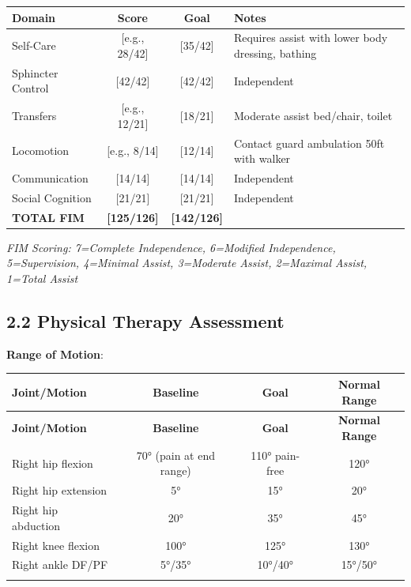 \documentclass[11pt,letterpaper]{article}
\begin{document}
\begin{tabularx}{\textwidth}{|l|c|c|X|}
\hline
\textbf{Domain} & \textbf{Score} & \textbf{Goal} & \textbf{Notes} \\ \hline
Self-Care & [e.g., 28/42] & [35/42] & Requires assist with lower body dressing, bathing \\ \hline
Sphincter Control & [42/42] & [42/42] & Independent \\ \hline
Transfers & [e.g., 12/21] & [18/21] & Moderate assist bed/chair, toilet \\ \hline
Locomotion & [e.g., 8/14] & [12/14] & Contact guard ambulation 50ft with walker \\ \hline
Communication & [14/14] & [14/14] & Independent \\ \hline
Social Cognition & [21/21] & [21/21] & Independent \\ \hline
\textbf{TOTAL FIM} & \textbf{[125/126]} & \textbf{[142/126]} & \\ \hline
\end{tabularx}

\vspace{0.5em}
\textit{FIM Scoring: 7=Complete Independence, 6=Modified Independence, 5=Supervision, 4=Minimal Assist, 3=Moderate Assist, 2=Maximal Assist, 1=Total Assist}

\subsection*{2.2 Physical Therapy Assessment}

\textbf{Range of Motion}:
\begin{longtable}{|l|c|c|c|}
\hline
\textbf{Joint/Motion} & \textbf{Baseline} & \textbf{Goal} & \textbf{Normal Range} \\ \hline
\endfirsthead
\hline
\textbf{Joint/Motion} & \textbf{Baseline} & \textbf{Goal} & \textbf{Normal Range} \\ \hline
\endhead
Right hip flexion & 70° (pain at end range) & 110° pain-free & 120° \\ \hline
Right hip extension & 5° & 15° & 20° \\ \hline
Right hip abduction & 20° & 35° & 45° \\ \hline
Right knee flexion & 100° & 125° & 130° \\ \hline
Right ankle DF/PF & 5°/35° & 10°/40° & 15°/50° \\ \hline
[Additional joints] & & & \\ \hline
\end{longtable}
\end{document}
